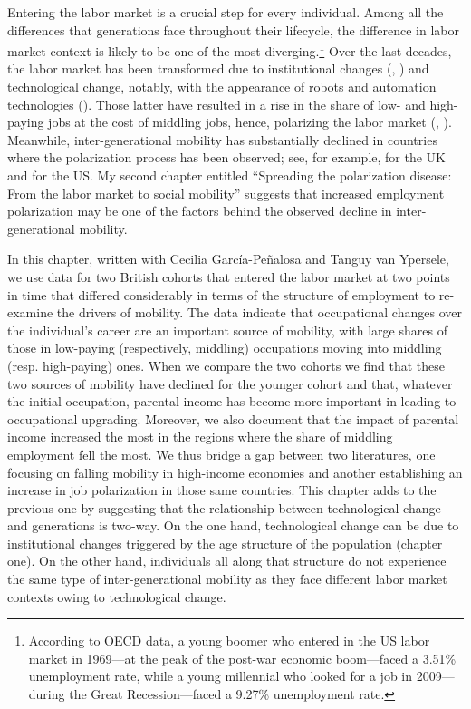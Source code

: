 Entering the labor market is a crucial step for every individual. Among all the differences that generations face throughout their lifecycle, the difference in labor market context is likely to be one of the most diverging.\footnote{According to OECD data, a young boomer who entered in the US labor market in 1969---at the peak of the post-war economic boom---faced a 3.51\% unemployment rate, while a young millennial who looked for a job in 2009---during the Great Recession---faced a 9.27\% unemployment rate.}
Over the last decades, the labor market has been transformed due to institutional changes (\citealt{Bentolila1990Firing}, \citealt{Bentolila2003Explaining}) and technological change, notably, with the appearance of robots and automation technologies (\citealt{Acemoglu2020Robots}). Those latter have resulted in a rise in the share of low- and high-paying jobs at the cost of middling jobs, hence, polarizing the labor market (\citealt{Autor2003Skill}, \cite{Goos2007Lousy}). 
Meanwhile, inter-generational mobility has substantially declined in countries where the polarization process has been observed; see, for example, \citet{Blanden2007Accounting} for the UK and \citet{Chetty2020Race} for the US.
My second chapter entitled ``Spreading the polarization disease: From the labor market to social mobility'' suggests that increased employment polarization may be one of the factors behind the observed decline in inter-generational mobility.

In this chapter, written with Cecilia García-Peñalosa and Tanguy van Ypersele, we use data for two British cohorts that entered the labor market at two points in time that differed considerably in terms of the structure of employment to re-examine the drivers of mobility. The data indicate that occupational changes over the individual’s career are an important source of mobility, with large shares of those in low-paying (respectively, middling) occupations moving into middling (resp. high-paying) ones. When we compare the two cohorts we find that these two sources of mobility have declined for the younger cohort and that, whatever the initial occupation, parental income has become more important in leading to occupational upgrading. Moreover, we also document that the impact of parental income increased the most in the regions where the share of middling employment fell the most. We thus bridge a gap between two literatures, one focusing on falling mobility in high-income economies and another establishing an increase in job polarization in those same countries. This chapter adds to the previous one by suggesting that the relationship between technological change and generations is two-way. On the one hand, technological change can be due to institutional changes triggered by the age structure of the population (chapter one). On the other hand, individuals all along that structure do not experience the same type of inter-generational mobility as they face different labor market contexts owing to technological change.

